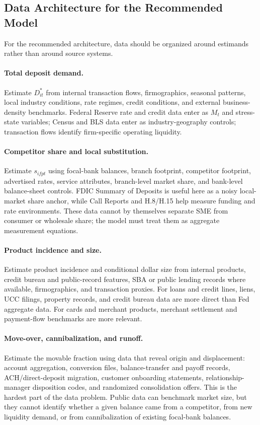 \documentclass[11pt]{article}
\begin{document}
\subsection{Data Architecture for the Recommended Model}

For the recommended architecture, data should be organized around estimands
rather than around source systems.

\paragraph{Total deposit demand.}
Estimate $D_{it}^{*}$ from internal transaction flows, firmographics, seasonal
patterns, local industry conditions, rate regimes, credit conditions, and
external business-density benchmarks. Federal Reserve rate and credit data enter
as $M_t$ and stress-state variables; Census and BLS data enter as
industry-geography controls; transaction flows identify firm-specific operating
liquidity.

\paragraph{Competitor share and local substitution.}
Estimate $s_{ifpt}$ using focal-bank balances, branch footprint, competitor
footprint, advertised rates, service attributes, branch-level market share, and
bank-level balance-sheet controls. FDIC Summary of Deposits is useful here as a
noisy local-market share anchor, while Call Reports and H.8/H.15 help measure
funding and rate environments. These data cannot by themselves separate SME
from consumer or wholesale share; the model must treat them as aggregate
measurement equations.

\paragraph{Product incidence and size.}
Estimate product incidence and conditional dollar size from internal products,
credit bureau and public-record features, SBA or public lending records where
available, firmographics, and transaction proxies. For loans and credit lines,
liens, UCC filings, property records, and credit bureau data are more direct
than Fed aggregate data. For cards and merchant products, merchant settlement
and payment-flow benchmarks are more relevant.

\paragraph{Move-over, cannibalization, and runoff.}
Estimate the movable fraction using data that reveal origin and displacement:
account aggregation, conversion files, balance-transfer and payoff records,
ACH/direct-deposit migration, customer onboarding statements, relationship-
manager disposition codes, and randomized consolidation offers. This is the
hardest part of the data problem. Public data can benchmark market size, but
they cannot identify whether a given balance came from a competitor, from new
liquidity demand, or from cannibalization of existing focal-bank balances.
\end{document}
